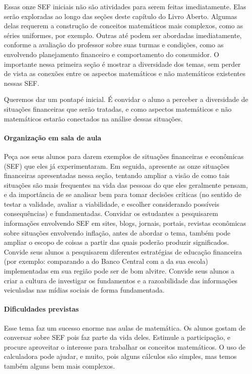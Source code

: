 \clearmargin
\begin{texto}
{
  Essas onze SEF iniciais não são atividades para serem feitas imediatamente. Elas serão exploradas ao longo das seções deste capítulo do Livro Aberto. Algumas delas requerem a construção de conceitos matemáticos mais complexos, como as séries uniformes, por exemplo. Outras até podem ser abordadas imediatamente, conforme a avaliação do professor sobre suas turmas e condições, como as envolvendo planejamento financeiro e comportamento do consumidor. O importante nessa primeira seção é mostrar a diversidade dos temas, sem perder de vista as conexões entre os aspectos matemáticos e não matemáticos existentes nessas SEF.

  Queremos dar um pontapé inicial. É convidar o aluno a perceber a diversidade de situações financeiras que serão tratadas, e como aspectos matemáticos e não matemáticos estarão conectados na análise dessas situações.

  \paragraph{Organização em sala de aula} Peça aos seus alunos para darem exemplos de situações financeiras e econômicas (SEF) que eles já experimentaram. Em seguida, apresente as onze situações financeiras apresentadas nessa seção, tentando ampliar a visão de como tais situações são mais frequentes na vida das pessoas do que eles geralmente pensam, e da importância de se analisar bem para tomar decisões críticas (no sentido de testar a validade, avaliar a viabilidade, e escolher considerando possíveis consequências) e fundamentadas. Convidar os estudantes a pesquisarem informações envolvendo SEF em sites, blogs, jornais, portais, revistas econômicas sobre situações envolvendo inflação, antes de abordar o tema, também pode ampliar o escopo de coisas a partir das quais poderão produzir significados. Convide seus alunos a pesquisarem diferentes estratégias de educação financeira (por exemplo: comparando a do Banco Central com a da sua escola) implementadas em sua região pode ser de bom alvitre. Convide seus alunos a criar a cultura de investigar os fundamentos e a razoabilidade das informações veiculadas nas mídias sociais de forma fundamentada.

  \paragraph{Dificuldades previstas} Esse tema faz um sucesso enorme nas aulas de matemática. Os alunos gostam de conversar sobre SEF pois faz parte da vida deles. Estimule a participação, e procure aproveitar o interesse para trabalhar os conceitos matemáticos. O uso de calculadora pode ajudar, e muito, pois alguns cálculos são simples, mas temos também alguns bem mais complexos. 
}
\end{texto}
